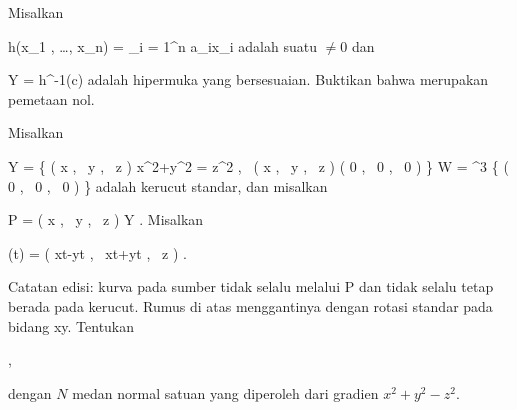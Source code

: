 \setcounter{section}{4}


{}
{

Misalkan

\mavergleichskette
{\vergleichskette
{ h(x_1 , \ldots , x_n)
}
{ = }{ \sum_{i = 1}^n a_ix_i
}
{  }{
}
{    }{
}
{   }{
}
}
{}{}{}
adalah suatu
$\neq 0$ dan

\mavergleichskette
{\vergleichskette
{ Y
}
{ = }{ h^{-1}(c)
}
{  }{
}
{    }{
}
{   }{
}
}
{}{}{}
adalah hipermuka yang bersesuaian. Buktikan bahwa
merupakan pemetaan nol.

}
{} {}

{}
{

Misalkan

\mavergleichskettedisp
{\vergleichskette
{ Y
}
{ =} { \left\{  \left(  x   , \,   y  , \,  z                 \right)   \mid   x^2+y^2 = z^2 , \,  \left(  x   , \,   y  , \,  z                 \right)  \neq  \left(  0   , \,   0  , \,   0                 \right)       \right\}
}
{ \subseteq} { W
}
{ =} { \R^3 \setminus \{  \left(  0   , \,   0  , \,   0                 \right) \}
}
{ } {
}
}
{}{}{}
adalah kerucut standar, dan misalkan

\mavergleichskette
{\vergleichskette
{ P
}
{ = }{ \left(  x   , \,   y  , \,  z                 \right)
}
{ \in }{ Y
}
{    }{
}
{   }{
}
}
{}{}{.}
Misalkan

\mavergleichskettedisp
{\vergleichskette
{ \gamma(t)
}
{ =} { \left(  x\cos t-y\sin t   , \,   x\sin t+y\cos t  , \,  z                 \right)
}
{ } {
}
{ } {
}
{ } {
}
}
{}{}{.}

Catatan edisi: kurva pada sumber tidak selalu melalui P dan tidak selalu tetap berada pada kerucut. Rumus di atas menggantinya dengan rotasi standar pada bidang xy.
Tentukan

 { , }

dengan $N$ medan normal satuan yang diperoleh dari gradien $x^2+y^2-z^2$.

}
{} {}

